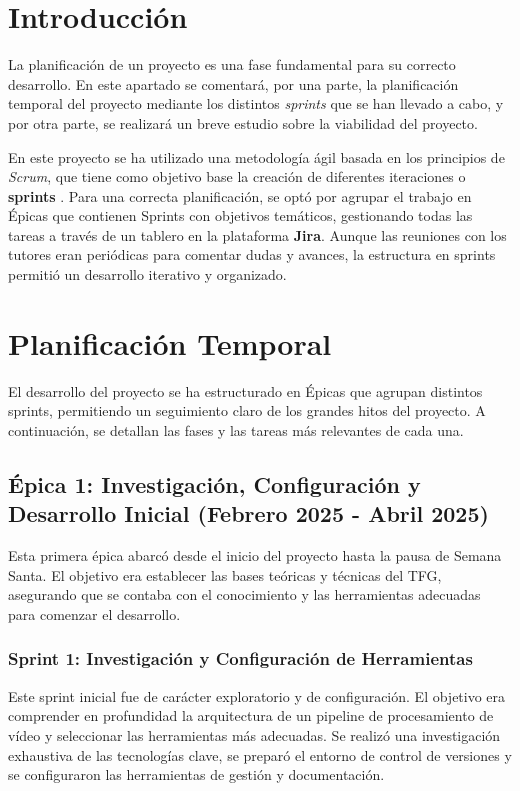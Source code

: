 \label{apendice:plan_proyecto}

\section{Introducción}
\label{sec:plan_intro}

La planificación de un proyecto es una fase fundamental para su correcto desarrollo. En este apartado se comentará, por una parte, la planificación temporal del proyecto mediante los distintos \textit{sprints} que se han llevado a cabo, y por otra parte, se realizará un breve estudio sobre la viabilidad del proyecto.

En este proyecto se ha utilizado una metodología ágil basada en los principios de \textit{Scrum}, que tiene como objetivo base la creación de diferentes iteraciones o \textbf{sprints} \cite{trigas2012metodologia}. Para una correcta planificación, se optó por agrupar el trabajo en Épicas que contienen Sprints con objetivos temáticos, gestionando todas las tareas a través de un tablero en la plataforma \textbf{Jira}. Aunque las reuniones con los tutores eran periódicas para comentar dudas y avances, la estructura en sprints permitió un desarrollo iterativo y organizado.

\section{Planificación Temporal}
\label{sec:plan_temporal}
El desarrollo del proyecto se ha estructurado en Épicas que agrupan distintos sprints, permitiendo un seguimiento claro de los grandes hitos del proyecto. A continuación, se detallan las fases y las tareas más relevantes de cada una.

\subsection{Épica 1: Investigación, Configuración y Desarrollo Inicial (Febrero 2025 - Abril 2025)}
\label{epic:1}
Esta primera épica abarcó desde el inicio del proyecto hasta la pausa de Semana Santa. El objetivo era establecer las bases teóricas y técnicas del TFG, asegurando que se contaba con el conocimiento y las herramientas adecuadas para comenzar el desarrollo.

\subsubsection{Sprint 1: Investigación y Configuración de Herramientas}
Este sprint inicial fue de carácter exploratorio y de configuración. El objetivo era comprender en profundidad la arquitectura de un pipeline de procesamiento de vídeo y seleccionar las herramientas más adecuadas. Se realizó una investigación exhaustiva de las tecnologías clave, se preparó el entorno de control de versiones y se configuraron las herramientas de gestión y documentación.

